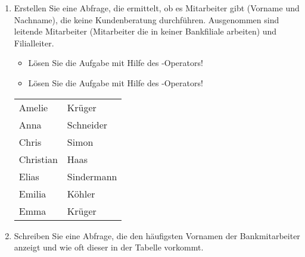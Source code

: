 \begin{enumerate}
        \item Erstellen Sie eine Abfrage, die ermittelt, ob es Mitarbeiter gibt
        (Vorname und Nachname), die keine Kundenberatung durchführen.
        Ausgenommen sind leitende Mitarbeiter (Mitarbeiter die in keiner
        Bankfiliale arbeiten) und Filialleiter.
        \begin{itemize}
          \item Lösen Sie die Aufgabe mit Hilfe des -Operators!
          \item Lösen Sie die Aufgabe mit Hilfe des -Operators!
        \end{itemize}
        \begin{center}
          \begin{small}
            \tablehead{}
            \begin{msoraclesql}
              \begin{supertabular}{ll}
                Amelie & Krüger \\
                Anna & Schneider \\
                Chris & Simon \\
                Christian & Haas \\
                Elias & Sindermann \\
                Emilia & Köhler \\
                Emma & Krüger \\
              \end{supertabular}
            \end{msoraclesql}
          \end{small}
        \end{center}
\clearpage
        \item Schreiben Sie eine Abfrage, die den häufigsten Vornamen der
        Bankmitarbeiter anzeigt und wie oft dieser in der Tabelle
         vorkommt.
        \begin{center}

\end{center}
\end{enumerate}

